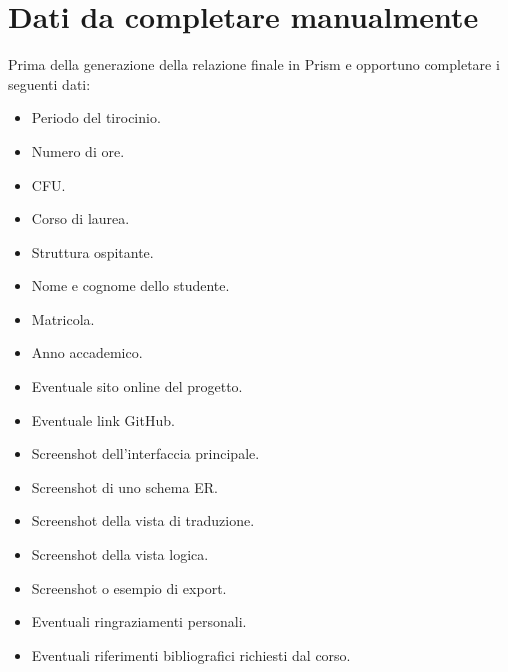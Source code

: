
\chapter{Dati da completare manualmente}\label{ax:dati-da-completare}

Prima della generazione della relazione finale in Prism e opportuno completare i seguenti dati:

\begin{itemize}
    \item Periodo del tirocinio.
    \item Numero di ore.
    \item CFU.
    \item Corso di laurea.
    \item Struttura ospitante.
    \item Nome e cognome dello studente.
    \item Matricola.
    \item Anno accademico.
    \item Eventuale sito online del progetto.
    \item Eventuale link GitHub.
    \item Screenshot dell'interfaccia principale.
    \item Screenshot di uno schema ER.
    \item Screenshot della vista di traduzione.
    \item Screenshot della vista logica.
    \item Screenshot o esempio di export.
    \item Eventuali ringraziamenti personali.
    \item Eventuali riferimenti bibliografici richiesti dal corso.
\end{itemize}
